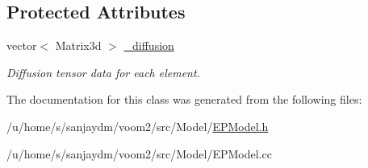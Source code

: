 \subsection*{Protected Attributes}
\begin{DoxyCompactItemize}
\item 
\hypertarget{classvoom_1_1_e_p_model_a594a746e2b5811d827fa48803c9da534}{
vector$<$ Matrix3d $>$ \hyperlink{classvoom_1_1_e_p_model_a594a746e2b5811d827fa48803c9da534}{\_\-diffusion}}
\label{classvoom_1_1_e_p_model_a594a746e2b5811d827fa48803c9da534}

\begin{DoxyCompactList}\small\item\em Diffusion tensor data for each element. \item\end{DoxyCompactList}\end{DoxyCompactItemize}


The documentation for this class was generated from the following files:\begin{DoxyCompactItemize}
\item 
/u/home/s/sanjaydm/voom2/src/Model/\hyperlink{_e_p_model_8h}{EPModel.h}\item 
/u/home/s/sanjaydm/voom2/src/Model/EPModel.cc\end{DoxyCompactItemize}
